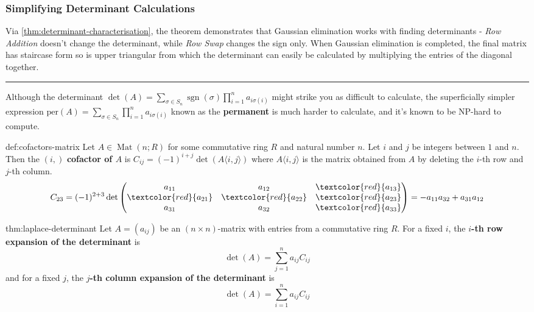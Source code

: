 \documentclass{article}
\DeclareMathOperator{\sgn}{sgn}
\DeclareMathOperator{\Mat}{Mat}
\begin{document}
\subsubsection{Simplifying Determinant Calculations}
Via \ref{thm:determinant-characterisation}, the theorem demonstrates that Gaussian elimination works with finding determinants - \textit{Row Addition} doesn't change the determinant, while \textit{Row Swap} changes the sign only. When Gaussian elimination is completed, the final matrix has staircase form so is upper triangular from which the determinant can easily be calculated by multiplying the entries of the diagonal together.

\noindent\rule{\textwidth}{0.2pt}
Although the determinant $\det(A) = \sum_{\sigma\in S_{n}} \sgn(\sigma) \prod_{i = 1}^{n} a_{i\sigma(i)}$ might strike you as difficult to calculate, the superficially simpler expression $\text{per}(A) = \sum_{\sigma\in S_{n}}\prod_{i=1}^{n} a_{i\sigma(i)}$ known as the \textbf{permanent} is much harder to calculate, and it's known to be NP-hard to compute.

\begin{dfn}{def:cofactors-matrix}{}
    Let $A \in \Mat(n;R)$ for some commutative ring $R$ and natural number $n$. Let $i$ and $j$ be integers between $1$ and $n$. Then the $(i, )$ \textbf{cofactor of $A$} is $C_{ij} = (-1)^{i + j} \det(A\langle i,j \rangle)$ where $A\langle i, j \rangle$ is the matrix obtained from $A$ by deleting the $i$-th row and $j$-th column.
    \[C_{23} = (-1)^{2 + 3} \det \begin{pmatrix}
        a_{11} & a_{12}& \textcolor{red}{a_{13}}\\
        \textcolor{red}{a_{21}}& \textcolor{red}{a_{22}}& \textcolor{red}{a_{23}}\\
        a_{31}& a_{32}& \textcolor{red}{a_{33}}
    \end{pmatrix} = -a_{11}a_{32} + a_{31}a_{12}\]
\end{dfn}

\begin{thm}{thm:laplace-determinant}{}
    Let $A = (a_{ij})$ be an $(n \times n)$-matrix with entries from a commutative ring $R$. For a fixed $i$, the \textbf{$i$-th row expansion of the determinant} is
    \[\det(A) = \sum_{j = 1}^{n}a_{ij}C_{ij}\]
    and for a fixed $j$, the \textbf{$j$-th column expansion of the determinant} is
    \[\det(A) = \sum_{i = 1}^{n} a_{ij} C_{ij}\]
\end{thm}
\end{document}
